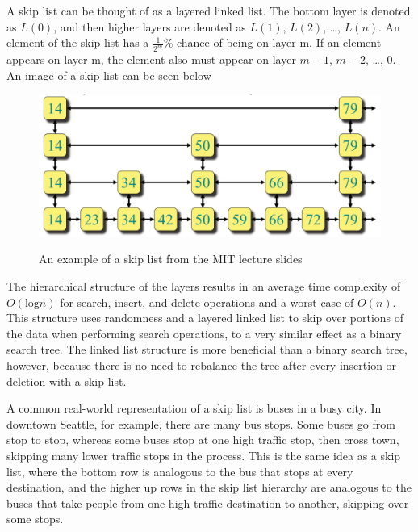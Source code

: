 \documentclass{article}
\begin{document}
A skip list can be thought of as a layered linked list. The bottom layer is denoted as $L(0)$, and then higher layers are denoted as $L(1)$, $L(2)$, \ldots, $L(n)$. An element of the skip list has a $\frac{1}{2^m}$\% chance of being on layer m. If an element appears on layer m, the element also must appear on layer $m-1$, $m-2$, \ldots, $0$. An image of a skip list can be seen below

\begin{figure}[h]
    \centering
    \includegraphics[width=\textwidth,keepaspectratio]{Images/SkipList_MIT.PNG}
    \label{fig:skip_list}
    \caption{An example of a skip list from the MIT lecture slides}
\end{figure}

The hierarchical structure of the layers results in an average time complexity of $O(\text{log} n)$ for search, insert, and delete operations and a worst case of $O(n)$. This structure uses randomness and a layered linked list to skip over portions of the data when performing search operations, to a very similar effect as a binary search tree. The linked list structure is more beneficial than a binary search tree, however, because there is no need to rebalance the tree after every insertion or deletion with a skip list.

A common real-world representation of a skip list is buses in a busy city. In downtown Seattle, for example, there are many bus stops. Some buses go from stop to stop, whereas some buses stop at one high traffic stop, then cross town, skipping many lower traffic stops in the process. This is the same idea as a skip list, where the bottom row is analogous to the bus that stops at every destination, and the higher up rows in the skip list hierarchy are analogous to the buses that take people from one high traffic destination to another, skipping over some stops. 
\end{document}
